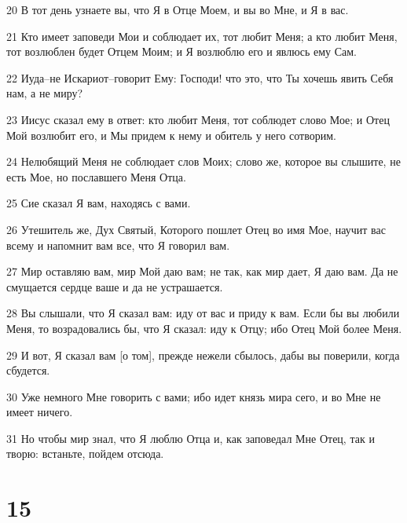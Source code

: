 \par 20 В тот день узнаете вы, что Я в Отце Моем, и вы во Мне, и Я в вас.
\par 21 Кто имеет заповеди Мои и соблюдает их, тот любит Меня; а кто любит Меня, тот возлюблен будет Отцем Моим; и Я возлюблю его и явлюсь ему Сам.
\par 22 Иуда--не Искариот--говорит Ему: Господи! что это, что Ты хочешь явить Себя нам, а не миру?
\par 23 Иисус сказал ему в ответ: кто любит Меня, тот соблюдет слово Мое; и Отец Мой возлюбит его, и Мы придем к нему и обитель у него сотворим.
\par 24 Нелюбящий Меня не соблюдает слов Моих; слово же, которое вы слышите, не есть Мое, но пославшего Меня Отца.
\par 25 Сие сказал Я вам, находясь с вами.
\par 26 Утешитель же, Дух Святый, Которого пошлет Отец во имя Мое, научит вас всему и напомнит вам все, что Я говорил вам.
\par 27 Мир оставляю вам, мир Мой даю вам; не так, как мир дает, Я даю вам. Да не смущается сердце ваше и да не устрашается.
\par 28 Вы слышали, что Я сказал вам: иду от вас и приду к вам. Если бы вы любили Меня, то возрадовались бы, что Я сказал: иду к Отцу; ибо Отец Мой более Меня.
\par 29 И вот, Я сказал вам [о том], прежде нежели сбылось, дабы вы поверили, когда сбудется.
\par 30 Уже немного Мне говорить с вами; ибо идет князь мира сего, и во Мне не имеет ничего.
\par 31 Но чтобы мир знал, что Я люблю Отца и, как заповедал Мне Отец, так и творю: встаньте, пойдем отсюда.

\chapter{15}

